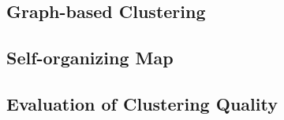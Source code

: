 \subsection{Graph-based Clustering}

\subsection{Self-organizing Map}

\subsection{Evaluation of Clustering Quality}



\newpage


